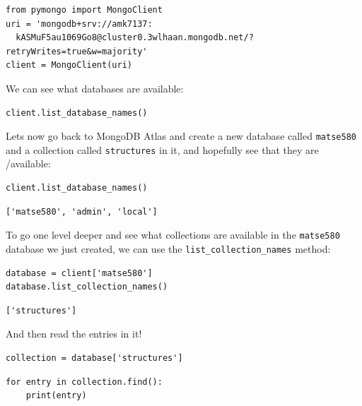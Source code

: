 \begin{verbatim}
from pymongo import MongoClient
uri = 'mongodb+srv://amk7137:
  kASMuF5au1069Go8@cluster0.3wlhaan.mongodb.net/?retryWrites=true&w=majority'
client = MongoClient(uri)
\end{verbatim}

We can see what databases are available:

\begin{verbatim}
client.list_database_names()
\end{verbatim}

Lets now go back to MongoDB Atlas and create a new database called
\texttt{matse580} and a collection called
\texttt{structures} in it, and hopefully see that they
are /available:

\begin{verbatim}
client.list_database_names()
\end{verbatim}

\begin{verbatim}
['matse580', 'admin', 'local']
\end{verbatim}

To go one level deeper and see what collections are available in the
\texttt{matse580} database we just created, we can use
the \texttt{list\_collection\_names} method:

\begin{verbatim}
database = client['matse580']
database.list_collection_names()
\end{verbatim}

\begin{verbatim}
['structures']
\end{verbatim}

And then read the entries in it!

\begin{verbatim}
collection = database['structures']
\end{verbatim}

\begin{verbatim}
for entry in collection.find():
    print(entry)
\end{verbatim}

